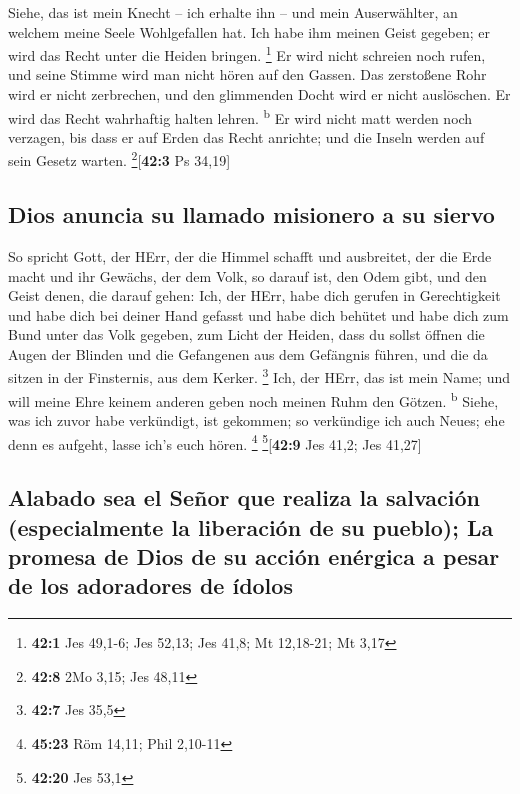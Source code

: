  Siehe, das ist mein Knecht -- ich erhalte ihn -- und mein
Auserwählter, an welchem meine Seele Wohlgefallen hat. Ich habe ihm
meinen Geist gegeben; er wird das Recht unter die Heiden bringen.
\footnote{\textbf{42:1} Jes 49,1-6; Jes 52,13; Jes 41,8; Mt 12,18-21; Mt
  3,17}  Er wird nicht schreien noch rufen, und seine
Stimme wird man nicht hören auf den Gassen.  Das
zerstoßene Rohr wird er nicht zerbrechen, und den glimmenden Docht wird
er nicht auslöschen. Er wird das Recht wahrhaftig halten lehren.
\textsuperscript{b}  Er wird nicht matt werden noch
verzagen, bis dass er auf Erden das Recht anrichte; und die Inseln
werden auf sein Gesetz warten. \footnote{\textbf{42:8} 2Mo 3,15; Jes
  48,11}{[}\textbf{42:3} Ps 34,19{]}

\hypertarget{dios-anuncia-su-llamado-misionero-a-su-siervo}{%
\subsection{Dios anuncia su llamado misionero a su
siervo}\label{dios-anuncia-su-llamado-misionero-a-su-siervo}}

 So spricht Gott, der HErr, der die Himmel schafft und
ausbreitet, der die Erde macht und ihr Gewächs, der dem Volk, so darauf
ist, den Odem gibt, und den Geist denen, die darauf gehen:
 Ich, der HErr, habe dich gerufen in Gerechtigkeit und
habe dich bei deiner Hand gefasst und habe dich behütet und habe dich
zum Bund unter das Volk gegeben, zum Licht der Heiden, 
dass du sollst öffnen die Augen der Blinden und die Gefangenen aus dem
Gefängnis führen, und die da sitzen in der Finsternis, aus dem Kerker.
\footnote{\textbf{42:7} Jes 35,5}  Ich, der HErr, das ist
mein Name; und will meine Ehre keinem anderen geben noch meinen Ruhm den
Götzen. \textsuperscript{b}  Siehe, was ich zuvor habe
verkündigt, ist gekommen; so verkündige ich auch Neues; ehe denn es
aufgeht, lasse ich's euch hören. \footnote{\textbf{45:23} Röm 14,11;
  Phil 2,10-11} \footnote{\textbf{42:20} Jes 53,1}{[}\textbf{42:9} Jes
41,2; Jes 41,27{]}

\hypertarget{alabado-sea-el-seuxf1or-que-realiza-la-salvaciuxf3n-especialmente-la-liberaciuxf3n-de-su-pueblo-la-promesa-de-dios-de-su-acciuxf3n-enuxe9rgica-a-pesar-de-los-adoradores-de-uxeddolos}{%
\subsection{Alabado sea el Señor que realiza la salvación (especialmente
la liberación de su pueblo); La promesa de Dios de su acción enérgica a
pesar de los adoradores de
ídolos}\label{alabado-sea-el-seuxf1or-que-realiza-la-salvaciuxf3n-especialmente-la-liberaciuxf3n-de-su-pueblo-la-promesa-de-dios-de-su-acciuxf3n-enuxe9rgica-a-pesar-de-los-adoradores-de-uxeddolos}}

